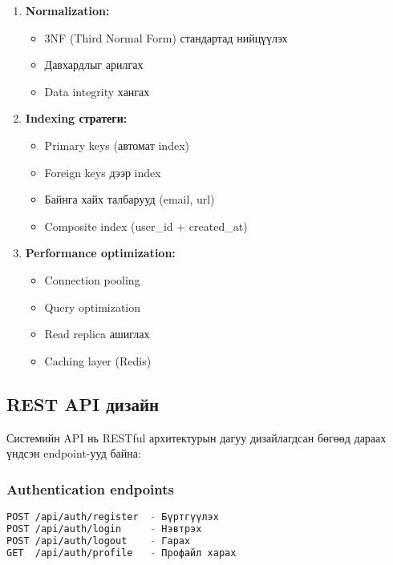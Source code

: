 \documentclass[main.tex]{subfiles}
\begin{document}
\begin{enumerate}
    \item \textbf{Normalization:}
    \begin{itemize}
        \item 3NF (Third Normal Form) стандартад нийцүүлэх
        \item Давхардлыг арилгах
        \item Data integrity хангах
    \end{itemize}
    
    \item \textbf{Indexing стратеги:}
    \begin{itemize}
        \item Primary keys (автомат index)
        \item Foreign keys дээр index
        \item Байнга хайх талбарууд (email, url)
        \item Composite index (user\_id + created\_at)
    \end{itemize}
    
    \item \textbf{Performance optimization:}
    \begin{itemize}
        \item Connection pooling
        \item Query optimization
        \item Read replica ашиглах
        \item Caching layer (Redis)
    \end{itemize}
\end{enumerate}

\subsection{REST API дизайн}

Системийн API нь RESTful архитектурын дагуу дизайлагдсан бөгөөд дараах үндсэн endpoint-ууд байна:

\subsubsection{Authentication endpoints}
\begin{lstlisting}[language=bash, caption=Аутентификацийн API]
POST /api/auth/register  - Бүртгүүлэх
POST /api/auth/login     - Нэвтрэх
POST /api/auth/logout    - Гарах
GET  /api/auth/profile   - Профайл харах
\end{lstlisting}
\end{document}
